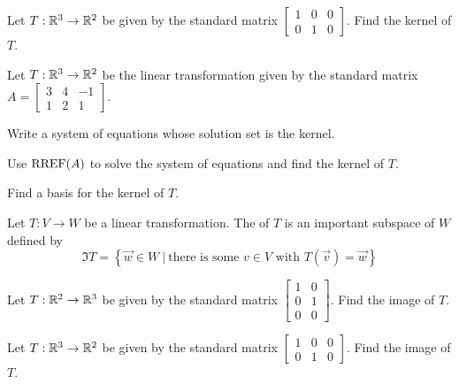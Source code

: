 \begin{applicationActivities}{2}{18}
\begin{activity}{5}
Let $T: \mathbb{R}^3 \rightarrow \mathbb{R}^2$ be given by the standard matrix $\begin{bmatrix} 1 & 0 &0  \\ 0 & 1 & 0 \end{bmatrix}$.  Find the kernel of $T$.
\end{activity}



\begin{activity}{10}
Let $T: \mathbb{R}^3 \rightarrow \mathbb{R}^2$ be the linear transformation given by the standard matrix $A=\begin{bmatrix} 3 & 4 & -1 \\ 1 & 2 & 1 \end{bmatrix}$.
\begin{subactivity}
Write a system of equations whose solution set is the kernel.
\end{subactivity}
\begin{subactivity}
Use $\operatorname{RREF}(A)$ to solve the system of equations and find the kernel of \(T\).
\end{subactivity}
\begin{subactivity}
Find a basis for the kernel of $T$.
\end{subactivity}
\end{activity}


\begin{definition}
Let $T: V \rightarrow W$ be a linear transformation.
The  of $T$ is an important subspace of \(W\) defined by
\[
\Im T = \left\{ \vec{w} \in W\ \big|\ \text{there is some }v\in V \text{ with } T(\vec{v})=\vec{w}\right\}
\]
\end{definition}

\begin{activity}{5}
Let $T: \mathbb{R}^2 \rightarrow \mathbb{R}^3$ be given by the standard matrix $\begin{bmatrix} 1 & 0 \\ 0 & 1 \\ 0 & 0 \end{bmatrix}$.  Find the image of $T$.
\end{activity}

\begin{activity}{5}
Let $T: \mathbb{R}^3 \rightarrow \mathbb{R}^2$ be given by the standard matrix $\begin{bmatrix} 1 & 0 &0  \\ 0 & 1 & 0 \end{bmatrix}$.  Find the image of $T$.
\end{activity}



\end{applicationActivities}
